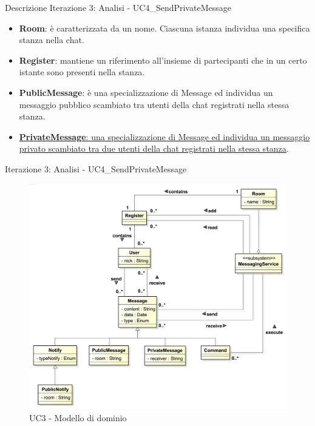 \documentclass[t]{beamer} %
\let\olditem=\item%
\renewcommand{\item}{\olditem \justifying}%
\begin{document}
\begin{frame} [allowframebreaks] {Descrizione Iterazione 3: Analisi - UC4\_SendPrivateMessage}
\begin{itemize}
          MessagingService (es. /join '\#Medical' richiesta da parte dell'utente a registrarsi alla stanza Medical).        
   \item \textbf{Room}: è caratterizzata da un nome. Ciascuna istanza individua una specifica stanza nella chat.
   \item \textbf{Register}: mantiene un riferimento all’insieme di partecipanti che in un certo istante sono presenti nella stanza.
   \item \textbf{PublicMessage}: è una specializzazione di Message ed individua un messaggio pubblico scambiato tra utenti della chat registrati nella 
         stessa stanza. 
   \item \underline{\textbf{PrivateMessage}: una specializzazione di Message ed individua un messaggio privato scambiato tra due utenti della chat registrati nella  
         stessa stanza}. 
  \end{itemize}
\end{frame}

\begin{frame} {Iterazione 3: Analisi - UC4\_SendPrivateMessage}
   \begin{figure}
     \includegraphics[scale=0.255]{image_astah/Iteration_3_DomainModel/UC4_SendPrivateMessage_DM.png}{\centering}
     \caption{UC3 - Modello di dominio}
     \label{fig_UC4_SPM_DM} 
   \end{figure}
\end{frame}
\end{document}
